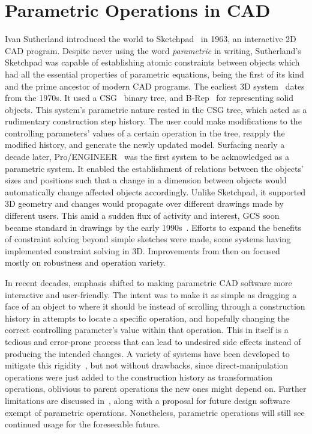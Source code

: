 \section{Parametric Operations in CAD}%
\label{sec:intro.parametric}

Ivan Sutherland introduced the world to
Sketchpad~\cite{Sutherland:1964:Sketchpad} in 1963, an interactive 2D \ac{CAD}
program. Despite never using the word \textit{parametric} in writing,
Sutherland's Sketchpad was capable of establishing atomic constraints between
objects which had all the essential properties of parametric equations, being
the first of its kind and the prime ancestor of modern \ac{CAD} programs.  The
earliest 3D system~\cite{Requicha:1980:RRS:356827.356833} dates from the 1970s.
It used a \ac{CSG}~\cite{Requicha:1977:CSG,Foley:1996:CGPP} binary tree, and
\ac{B-Rep}~\cite{Stroud:2006:BRMT} for representing solid objects.  This
system's parametric nature rested in the \ac{CSG} tree, which acted as a
rudimentary construction step history.  The user could make modifications to the
controlling parameters' values of a certain operation in the tree, reapply the
modified history, and generate the newly updated model.  Surfacing nearly a
decade later, Pro/ENGINEER~\cite{PTC:1980:ProENGINEER,Jabi:2013:PDA} was the
first system to be acknowledged as a parametric system.  It enabled the
establishment of relations between the objects' sizes and positions such that a
change in a dimension between objects would automatically change affected
objects accordingly.  Unlike Sketchpad, it supported 3D geometry and changes
would propagate over different drawings made by different users.  This amid a
sudden flux of activity and interest, \ac{GCS} soon became standard in drawings
by the early 1990s~\cite{Chung:1990:TEVPD,Owen:1991:ASGDC,Bouma:1995:GCS}.
Efforts to expand the benefits of constraint solving beyond simple sketches were
made, some systems having implemented constraint solving in 3D.  Improvements
from then on focused mostly on robustness and operation variety.

In recent decades, emphasis shifted to making parametric \ac{CAD} software more
interactive and user-friendly.  The intent was to make it as simple as dragging
a face of an object to where it should be instead of scrolling through a
construction history in attempts to locate a specific operation, and hopefully
changing the correct controlling parameter's value within that operation.  This
in itself is a tedious and error-prone process that can lead to undesired
side effects instead of producing the intended changes.  A variety of systems
have been developed to mitigate this
rigidity~\cite{Samuel:2006:CPPUP,Wu:2007:MSMSM,Clarke:2009:SM}, but not without
drawbacks, since direct-manipulation operations were just added to the
construction history as transformation operations, oblivious to parent
operations the new ones might depend on.  Further limitations are discussed
in~\cite{Bettig:2005:LPOSSD}, along with a proposal for future design software
exempt of parametric operations.  Nonetheless, parametric operations will still
see continued usage for the foreseeable future.
